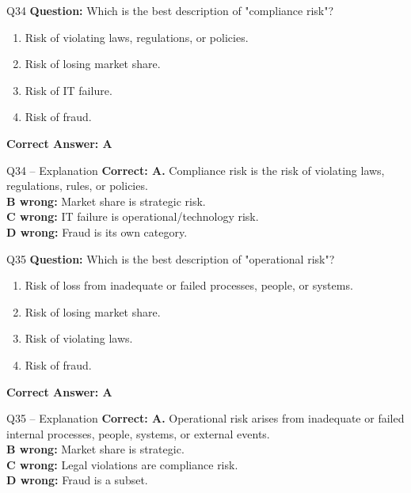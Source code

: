 \documentclass[aspectratio=169,10pt]{beamer}
\begin{document}
	\begin{frame}[t]{Q34}
		\small
		\textbf{Question:} Which is the best description of "compliance risk"?
		\begin{enumerate}[label=\Alph*.,itemsep=1pt,topsep=2pt]
			\item Risk of violating laws, regulations, or policies.
			\item Risk of losing market share.
			\item Risk of IT failure.
			\item Risk of fraud.
		\end{enumerate}
		\vspace{4pt}
		\textbf{Correct Answer: A}
	\end{frame}
	
	\begin{frame}[t]{Q34 -- Explanation}
		\small
		\textbf{Correct: A.} Compliance risk is the risk of violating laws, regulations, rules, or policies. \\[4pt]
		\textbf{B wrong:} Market share is strategic risk. \\[2pt]
		\textbf{C wrong:} IT failure is operational/technology risk. \\[2pt]
		\textbf{D wrong:} Fraud is its own category.
	\end{frame}
	
	\begin{frame}[t]{Q35}
		\small
		\textbf{Question:} Which is the best description of "operational risk"?
		\begin{enumerate}[label=\Alph*.,itemsep=1pt,topsep=2pt]
			\item Risk of loss from inadequate or failed processes, people, or systems.
			\item Risk of losing market share.
			\item Risk of violating laws.
			\item Risk of fraud.
		\end{enumerate}
		\vspace{4pt}
		\textbf{Correct Answer: A}
	\end{frame}
	
	\begin{frame}[t]{Q35 -- Explanation}
		\small
		\textbf{Correct: A.} Operational risk arises from inadequate or failed internal processes, people, systems, or external events. \\[4pt]
		\textbf{B wrong:} Market share is strategic. \\[2pt]
		\textbf{C wrong:} Legal violations are compliance risk. \\[2pt]
		\textbf{D wrong:} Fraud is a subset.
	\end{frame}
	
\end{document}
